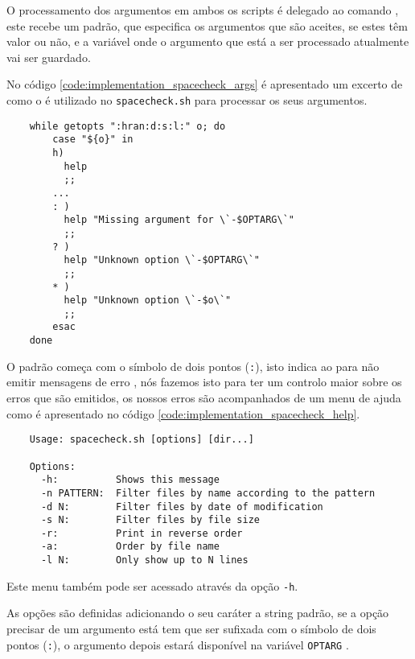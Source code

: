 O processamento dos argumentos em ambos os scripts é delegado ao comando
, este recebe um padrão, que especifica os argumentos que são
aceites, se estes têm valor ou não, e a variável onde o argumento que está a ser
processado atualmente vai ser guardado.

No código \ref{code:implementation_spacecheck_args} é apresentado um excerto de
como o  é utilizado no \Verb|spacecheck.sh| para processar
os seus argumentos.

\begin{listing}[H]
	\centering
	\begin{verbatim}
    while getopts ":hran:d:s:l:" o; do
        case "${o}" in
        h)
          help
          ;;
        ...
        : )
          help "Missing argument for \`-$OPTARG\`"
          ;;
        ? )
          help "Unknown option \`-$OPTARG\`"
          ;;
        * )
          help "Unknown option \`-$o\`"
          ;;
        esac
    done
  \end{verbatim}
	\cprotect\caption{Processamento de argumentos no \Verb|spacecheck.sh|}
	\label{code:implementation_spacecheck_args}
\end{listing}

O padrão começa com o símbolo de dois pontos (\Verb|:|), isto indica ao
 para não emitir mensagens de erro \cite[2837]{posix}, nós
fazemos isto para ter um controlo maior sobre os erros que são emitidos, os
nossos erros são acompanhados de um menu de ajuda como é apresentado no código
\ref{code:implementation_spacecheck_help}.

\begin{listing}[H]
	\centering
	\begin{verbatim}
    Usage: spacecheck.sh [options] [dir...]

    Options:
      -h:          Shows this message
      -n PATTERN:  Filter files by name according to the pattern
      -d N:        Filter files by date of modification
      -s N:        Filter files by file size
      -r:          Print in reverse order
      -a:          Order by file name
      -l N:        Only show up to N lines
  \end{verbatim}
	\cprotect\caption{Menu de ajuda do \Verb|spacecheck.sh|}
	\label{code:implementation_spacecheck_help}
\end{listing}

Este menu também pode ser acessado através da opção \Verb|-h|.

As opções são definidas adicionando o seu caráter a string padrão, se a opção
precisar de um argumento está tem que ser sufixada com o símbolo de dois pontos
(\Verb|:|), o argumento depois estará disponível na variável \Verb|OPTARG|
\cite[2838]{posix}.

